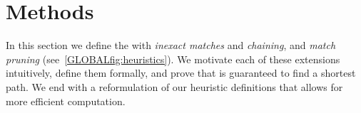 \label{GLOBALsec:methods}

\section{Methods}

In this section we define the \emph{\sh} with \emph{inexact matches} and \emph{chaining},
and \emph{match pruning} (see~\cref{GLOBALfig:heuristics}). We motivate each of
these extensions intuitively, define them formally, and prove that \A is
guaranteed to find a shortest path. We end with a reformulation of our
heuristic definitions that allows for more efficient computation.





